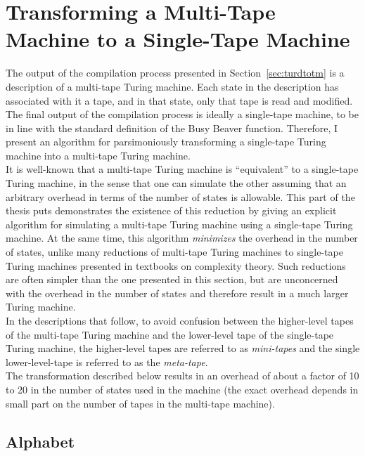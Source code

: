 \documentclass{report}
\begin{document}

\section{Transforming a Multi-Tape Machine to a Single-Tape Machine \label{sec:mttost}}

The output of the compilation process presented in Section~\ref{sec:turdtotm} is a description of a multi-tape Turing machine. Each state in the description has associated with it a tape, and in that state, only that tape is read and modified. The final output of the compilation process is ideally a single-tape machine, to be in line with the standard definition of the Busy Beaver function. Therefore, I present an algorithm for parsimoniously transforming a single-tape Turing machine into a multi-tape Turing machine. \\

It is well-known that a multi-tape Turing machine is ``equivalent'' to a single-tape Turing machine, in the sense that one can simulate the other assuming that an arbitrary overhead in terms of the number of states is allowable. This part of the thesis puts demonstrates the existence of this reduction by giving an explicit algorithm for simulating a multi-tape Turing machine using a single-tape Turing machine. At the same time, this algorithm \emph{minimizes} the overhead in the number of states, unlike many reductions of multi-tape Turing machines to single-tape Turing machines presented in textbooks on complexity theory. Such reductions are often simpler than the one presented in this section, but are unconcerned with the overhead in the number of states and therefore result in a much larger Turing machine. \\

In the descriptions that follow, to avoid confusion between the higher-level tapes of the multi-tape Turing machine and the lower-level tape of the single-tape Turing machine, the higher-level tapes are referred to as \emph{mini-tapes} and the single lower-level-tape is referred to as the \emph{meta-tape}. \\

The transformation described below results in an overhead of about a factor of 10 to 20 in the number of states used in the machine (the exact overhead depends in small part on the number of tapes in the multi-tape machine). 

\subsection{Alphabet}
\end{document}
